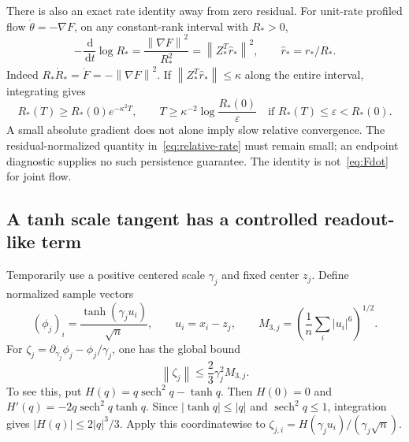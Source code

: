 \documentclass[11pt]{article}
\theoremstyle{remark}
\newcommand{\norm}[1]{\left\lVert #1\right\rVert}
\newcommand{\sech}{\operatorname{sech}}
\newcommand{\dd}{\,\mathrm{d}}
\begin{document}
There is also an exact rate identity away from zero residual. For unit-rate profiled flow $\dot\theta=-\nabla F$, on any constant-rank interval with $R_*>0$,
\begin{equation}
 -\frac{\dd}{\dd t}\log R_*
 =\frac{\norm{\nabla F}^2}{R_*^2}
 =\norm{Z_*^T\widehat r_*}^2,
 \qquad \widehat r_*=r_*/R_*.
 \label{eq:relative-rate}
\end{equation}
Indeed $R_*\dot R_*=\dot F=-\norm{\nabla F}^2$. If $\norm{Z_*^T\widehat r_*}\leq\kappa$ along the entire interval, integrating gives
\begin{equation}
 R_*(T)\geq R_*(0)e^{-\kappa^2T},\qquad
 T\geq\kappa^{-2}\log\frac{R_*(0)}{\varepsilon}
 \quad\text{if }R_*(T)\leq\varepsilon<R_*(0).
\end{equation}
A small absolute gradient does not alone imply slow relative convergence. The residual-normalized quantity in~\eqref{eq:relative-rate} must remain small; an endpoint diagnostic supplies no such persistence guarantee. The identity is not~\eqref{eq:Fdot} for joint flow.

\subsection{A tanh scale tangent has a controlled readout-like term}

Temporarily use a positive centered scale $\gamma_j$ and fixed center $z_j$. Define normalized sample vectors
\begin{equation}
 (\phi_j)_i=\frac{\tanh(\gamma_j u_i)}{\sqrt n},\qquad
 u_i=x_i-z_j,\qquad
 M_{3,j}=\left(\frac1n\sum_i|u_i|^6\right)^{1/2}.
\end{equation}
For $\zeta_j=\partial_{\gamma_j}\phi_j-\phi_j/\gamma_j$, one has the global bound
\begin{equation}
 \norm{\zeta_j}\leq\frac23\gamma_j^2M_{3,j}.
 \label{eq:tanh-remainder}
\end{equation}
To see this, put $H(q)=q\sech^2q-\tanh q$. Then $H(0)=0$ and $H'(q)=-2q\sech^2q\tanh q$. Since $|\tanh q|\leq|q|$ and $\sech^2q\leq1$, integration gives $|H(q)|\leq2|q|^3/3$. Apply this coordinatewise to $\zeta_{j,i}=H(\gamma_ju_i)/(\gamma_j\sqrt n)$.
\end{document}
